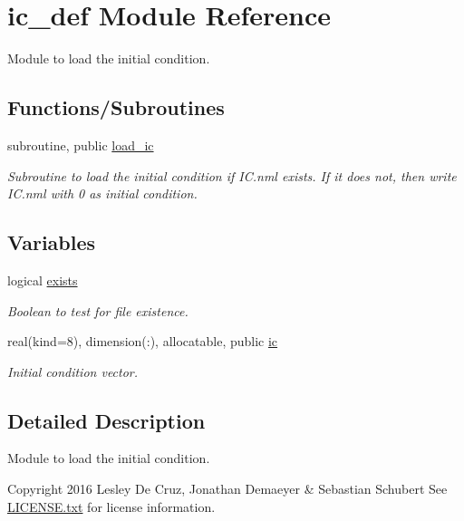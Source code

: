 \hypertarget{namespaceic__def}{}\section{ic\+\_\+def Module Reference}
\label{namespaceic__def}


Module to load the initial condition.  


\subsection*{Functions/\+Subroutines}
\begin{DoxyCompactItemize}
\item 
subroutine, public \hyperlink{namespaceic__def_af3d9de16d535e27cf3bacd7f82d68d54}{load\+\_\+ic}
\begin{DoxyCompactList}\small\item\em Subroutine to load the initial condition if I\+C.\+nml exists. If it does not, then write I\+C.\+nml with 0 as initial condition. \end{DoxyCompactList}\end{DoxyCompactItemize}
\subsection*{Variables}
\begin{DoxyCompactItemize}
\item 
logical \hyperlink{namespaceic__def_a989b031664e87b1a693a329ecd4f4721}{exists}
\begin{DoxyCompactList}\small\item\em Boolean to test for file existence. \end{DoxyCompactList}\item 
real(kind=8), dimension(\+:), allocatable, public \hyperlink{namespaceic__def_abef3b68b2ee81311ed2c796cba3a382f}{ic}
\begin{DoxyCompactList}\small\item\em Initial condition vector. \end{DoxyCompactList}\end{DoxyCompactItemize}


\subsection{Detailed Description}
Module to load the initial condition. 

\begin{DoxyCopyright}{Copyright}
2016 Lesley De Cruz, Jonathan Demaeyer \& Sebastian Schubert See \hyperlink{LICENSE_8txt}{L\+I\+C\+E\+N\+S\+E.\+txt} for license information. 
\end{DoxyCopyright}


